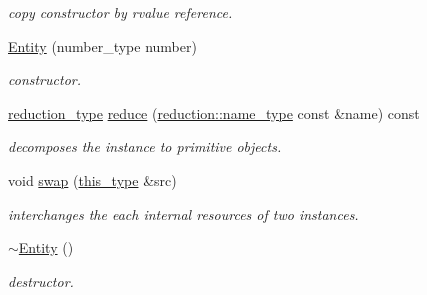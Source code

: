 \begin{DoxyCompactItemize}
\begin{DoxyCompactList}\small\item\em copy constructor by rvalue reference. \end{DoxyCompactList}\item 
\hyperlink{classhryky_1_1uri_1_1port_1_1_entity_a6d5986f29a8584f7ec8720f006559fbf}{Entity} (number\-\_\-type number)
\begin{DoxyCompactList}\small\item\em constructor. \end{DoxyCompactList}\item 
\hypertarget{classhryky_1_1uri_1_1port_1_1_entity_ad393f090d7bb1230ce0855a9f1df18a3}{\hyperlink{namespacehryky_a343a9a4c36a586be5c2693156200eadc}{reduction\-\_\-type} \hyperlink{classhryky_1_1uri_1_1port_1_1_entity_ad393f090d7bb1230ce0855a9f1df18a3}{reduce} (\hyperlink{namespacehryky_1_1reduction_ac686c30a4c8d196bbd0f05629a6b921f}{reduction\-::name\-\_\-type} const \&name) const }\label{classhryky_1_1uri_1_1port_1_1_entity_ad393f090d7bb1230ce0855a9f1df18a3}

\begin{DoxyCompactList}\small\item\em decomposes the instance to primitive objects. \end{DoxyCompactList}\item 
\hypertarget{classhryky_1_1uri_1_1port_1_1_entity_ae9c086b2e892d64c2a5ab57bfd24c980}{void \hyperlink{classhryky_1_1uri_1_1port_1_1_entity_ae9c086b2e892d64c2a5ab57bfd24c980}{swap} (\hyperlink{classhryky_1_1uri_1_1port_1_1_entity_a5039b7839f1b865fba0d30d01eac50f5}{this\-\_\-type} \&src)}\label{classhryky_1_1uri_1_1port_1_1_entity_ae9c086b2e892d64c2a5ab57bfd24c980}

\begin{DoxyCompactList}\small\item\em interchanges the each internal resources of two instances. \end{DoxyCompactList}\item 
\hypertarget{classhryky_1_1uri_1_1port_1_1_entity_a847ccc419b8ab88d4fbafd8adb265a8d}{\hyperlink{classhryky_1_1uri_1_1port_1_1_entity_a847ccc419b8ab88d4fbafd8adb265a8d}{$\sim$\-Entity} ()}\label{classhryky_1_1uri_1_1port_1_1_entity_a847ccc419b8ab88d4fbafd8adb265a8d}

\begin{DoxyCompactList}\small\item\em destructor. \end{DoxyCompactList}\end{DoxyCompactItemize}
